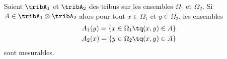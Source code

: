\begin{lemma} \label{LemAQmWEmN}
    Soient \( \tribA_1\) et \( \tribA_2\) des tribus sur les ensembles \( \Omega_1\) et \( \Omega_2\). Si \( A\in\tribA_1\otimes\tribA_2\) alors pour tout \( x\in \Omega_1\) et \( y\in\Omega_2\), les ensembles
    \begin{subequations}    \label{subEqCTtPccK}
        \begin{align}
            A_1(y)=\{ x\in\Omega_1\tq (x,y)\in A \}\\
            A_2(x)=\{ y\in\Omega_2\tq (x,y)\in A \}
        \end{align}
    \end{subequations}
    sont mesurables.
\end{lemma}


